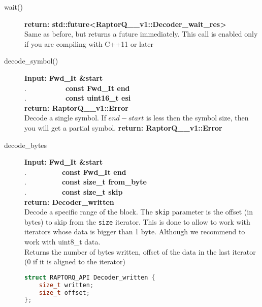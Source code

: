 \documentclass[11pt,a4paper]{refart}
\begin{document}
\begin{description}
\item[wait()] \textbf{return: std::future<RaptorQ\_\_v1::Decoder\_wait\_res>}\\
Same as before, but returns a future immediately. This call is enabled only if you are compiling with C++11 or later

\item[decode\_symbol()] \textbf{Input: Fwd\_It \&start}\\
.\ \ \ \ \ \ \ \ \ \ \ \textbf{const Fwd\_It end}\\
.\ \ \ \ \ \ \ \ \ \ \ \textbf{const uint16\_t esi} \\
\textbf{return: RaptorQ\_\_v1::Error}\\
Decode a single symbol. If $end-start$ is less then the symbol size, then you will get a partial symbol.
\textbf{return: RaptorQ\_\_v1::Error}\\

\item[decode\_bytes] \textbf{Input: Fwd\_It \&start}\\
.\ \ \ \ \ \ \ \ \ \ \textbf{const Fwd\_It end}\\
.\ \ \ \ \ \ \ \ \ \ \textbf{const size\_t from\_byte}\\
.\ \ \ \ \ \ \ \ \ \ \textbf{const size\_t skip}\\
\textbf{return: Decoder\_written} \\
Decode a specific range of the block. The \texttt{skip} parameter is the offset (in bytes) to skip from the \texttt{size} iterator. This is done to allow to work with iterators whose data is bigger than 1 byte. Although we recommend to work with uint8\_t data.\\
Returns the number of bytes written, offset of the data in the last iterator (0 if it is aligned to the iterator)
\begin{lstlisting}[language=c++]
struct RAPTORQ_API Decoder_written {
	size_t written;
	size_t offset;
};
\end{lstlisting}


\end{description}







\printindex
\end{document}
